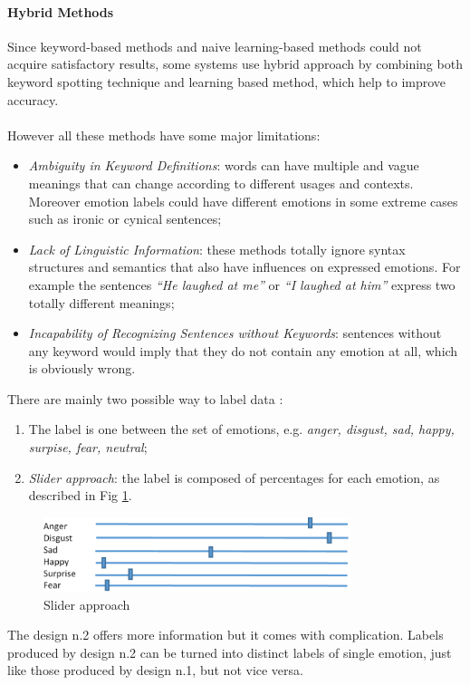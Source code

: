 \paragraph{Hybrid Methods}
Since keyword-based methods and naive learning-based methods could not acquire satisfactory results, some systems use hybrid approach by combining both keyword spotting technique and learning based method, which help to improve accuracy. \\
\\

However all these methods have some major limitations:
\begin{itemize}
\item \textit{Ambiguity in Keyword Definitions}: words can have multiple and vague meanings that can change according to different usages and contexts. Moreover emotion labels could have different emotions in some extreme cases such as ironic or cynical sentences; 
\item \textit{Lack of Linguistic Information}: these methods totally ignore syntax structures and semantics that also have influences on expressed emotions. For example the sentences \textit{``He laughed at me''} or \textit{``I laughed at him''} express two totally different meanings;
\item \textit{Incapability of Recognizing Sentences without Keywords}: sentences without any keyword would imply that they do not contain any emotion at all, which is obviously wrong. 
\end{itemize}

There are mainly two possible way to label data \cite{microsoft}:
\begin{enumerate}
\item The label is one between the set of emotions, e.g. \textit{anger, disgust, sad, happy, surpise, fear, neutral};
\item \textit{Slider approach}: the label is composed of percentages for each emotion, as described in Fig \ref{fig:emotion_labeling_sliders}.
\end{enumerate}

\begin{figure}[H]
\centering
\includegraphics[width=0.8\textwidth]{./chapters/chapter1/images/emotion_labeling_sliders}
\caption{Slider approach}
\label{fig:emotion_labeling_sliders}
\end{figure}

The design n.2 offers more information but it comes with complication. Labels produced by design n.2 can be turned into distinct labels of single emotion, just like those produced by design n.1, but not vice versa. 

